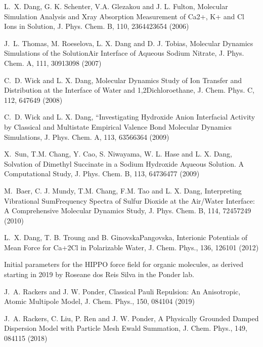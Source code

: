 \documentclass[letterpaper,11pt,english]{sphinxmanual}
\begin{document}
\sphinxAtStartPar
L. X. Dang, G. K. Schenter, V.\sphinxhyphen{}A. Glezakou and J. L. Fulton, Molecular Simulation Analysis and X\sphinxhyphen{}ray Absorption Measurement of Ca2+, K+ and Cl\sphinxhyphen{} Ions in Solution, J. Phys. Chem. B, 110, 23644\sphinxhyphen{}23654 (2006)

\sphinxAtStartPar
J. L. Thomas, M. Roeselova, L. X. Dang and D. J. Tobias, Molecular Dynamics Simulations of the Solution\sphinxhyphen{}Air Interface of Aqueous Sodium Nitrate, J. Phys. Chem. A, 111, 3091\sphinxhyphen{}3098 (2007)

\sphinxAtStartPar
C. D. Wick and L. X. Dang, Molecular Dynamics Study of Ion Transfer and Distribution at the Interface of Water and 1,2\sphinxhyphen{}Dichloroethane, J. Chem. Phys. C, 112, 647\sphinxhyphen{}649 (2008)

\sphinxAtStartPar
C. D. Wick and L. X. Dang, “Investigating Hydroxide Anion Interfacial Activity by Classical and Multistate Empirical Valence Bond Molecular Dynamics Simulations, J. Phys. Chem. A, 113, 6356\sphinxhyphen{}6364 (2009)

\sphinxAtStartPar
X. Sun, T.\sphinxhyphen{}M. Chang, Y. Cao, S. Niwayama, W. L. Hase and L. X. Dang, Solvation of Dimethyl Succinate in a Sodium Hydroxide Aqueous Solution. A Computational Study, J. Phys. Chem. B, 113, 6473\sphinxhyphen{}6477 (2009)

\sphinxAtStartPar
M. Baer, C. J. Mundy, T.\sphinxhyphen{}M. Chang, F.\sphinxhyphen{}M. Tao and L. X. Dang, Interpreting Vibrational Sum\sphinxhyphen{}Frequency Spectra of Sulfur Dioxide at the Air/Water Interface: A Comprehensive Molecular Dynamics Study, J. Phys. Chem. B, 114, 7245\sphinxhyphen{}7249 (2010)

\sphinxAtStartPar
L. X. Dang, T. B. Troung and B. Ginovska\sphinxhyphen{}Pangovska, Interionic Potentials of Mean Force for Ca+2\sphinxhyphen{}Cl\sphinxhyphen{} in Polarizable Water, J. Chem. Phys., 136, 126101 (2012)

\sphinxAtStartPar
{}

\sphinxAtStartPar
Initial parameters for the HIPPO force field for organic molecules, as derived starting in 2019 by Roseane dos Reis Silva in the Ponder lab.

\sphinxAtStartPar
J. A. Rackers and J. W. Ponder, Classical Pauli Repulsion: An Anisotropic, Atomic Multipole Model, J. Chem. Phys., 150, 084104 (2019)

\sphinxAtStartPar
J. A. Rackers, C. Liu, P. Ren and J. W. Ponder, A Physically Grounded Damped Dispersion Model with Particle Mesh Ewald Summation, J. Chem. Phys., 149, 084115 (2018)
\end{document}
